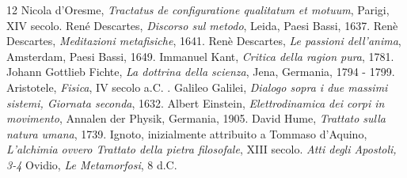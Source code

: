 \documentclass[a4paper,12pt]{report}
\begin{document}
 \begin{thebibliography}{12}
  Nicola d'Oresme,
  \textit{Tractatus de configuratione qualitatum et motuum},
  Parigi, XIV secolo.
  René Descartes, \textit{Discorso sul metodo}, Leida, Paesi Bassi, 1637. 
  Renè Descartes, \textit{Meditazioni metafisiche}, 1641.
  Renè Descartes, \textit{Le passioni dell'anima}, Amsterdam, Paesi Bassi, 1649. 
  Immanuel Kant, \textit{Critica della ragion pura}, 1781.
  Johann Gottlieb Fichte, \textit{La dottrina della scienza}, Jena, Germania, 1794 - 1799.
  Aristotele, \textit{Fisica}, IV secolo a.C. . 
  Galileo Galilei, \textit{Dialogo sopra i due massimi sistemi, Giornata seconda}, 1632. 
  Albert Einstein, \textit{Elettrodinamica dei corpi in movimento}, Annalen der Physik, Germania, 1905.   
  David Hume, \textit{Trattato sulla natura umana}, 1739.  
  Ignoto, inizialmente attribuito a Tommaso d'Aquino, \textit{L'alchimia ovvero Trattato della pietra filosofale}, XIII secolo.
  \textit{Atti degli Apostoli, 3-4}    
  Ovidio, \textit{Le Metamorfosi}, 8 d.C.  
\end{thebibliography}
\end{document}
